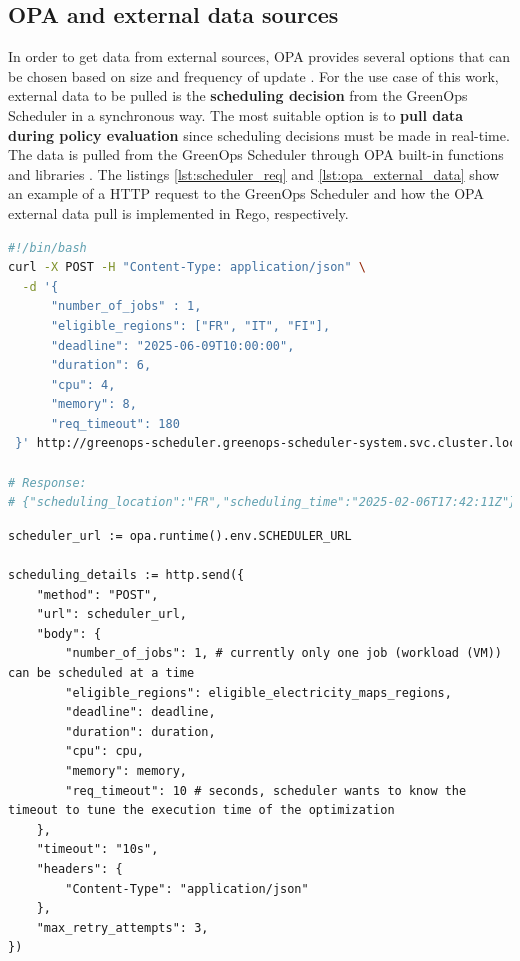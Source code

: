 \subsection{OPA and external data sources}
\label{sec:opa_external_data}

In order to get data from external sources, OPA provides several options that can be chosen based on size and frequency of update \cite{opa_external_data}.
For the use case of this work, external data to be pulled is the \textbf{scheduling decision} from the GreenOps Scheduler in a synchronous way.
The most suitable option is to \textbf{pull data during policy evaluation} since scheduling decisions must be made in real-time.
The data is pulled from the GreenOps Scheduler through OPA built-in functions and libraries \cite{opa_external_data}.
The listings \ref{lst:scheduler_req} and \ref{lst:opa_external_data} show an example of a HTTP request to the GreenOps Scheduler and how the OPA external data pull is implemented in Rego, respectively.

\begin{lstlisting}[language=sh, caption={GreenOps scheduler HTTP request example}, label={lst:scheduler_req}]
#!/bin/bash
curl -X POST -H "Content-Type: application/json" \
  -d '{
      "number_of_jobs" : 1,
      "eligible_regions": ["FR", "IT", "FI"],
      "deadline": "2025-06-09T10:00:00",
      "duration": 6,
      "cpu": 4,
      "memory": 8,
      "req_timeout": 180
 }' http://greenops-scheduler.greenops-scheduler-system.svc.cluster.local/scheduling

# Response: 
# {"scheduling_location":"FR","scheduling_time":"2025-02-06T17:42:11Z"}
\end{lstlisting}

\begin{lstlisting}[language=rego, caption={OPA external data pull}, label={lst:opa_external_data}]
scheduler_url := opa.runtime().env.SCHEDULER_URL

scheduling_details := http.send({
	"method": "POST",
	"url": scheduler_url,
	"body": {
		"number_of_jobs": 1, # currently only one job (workload (VM)) can be scheduled at a time
		"eligible_regions": eligible_electricity_maps_regions,
		"deadline": deadline,
		"duration": duration, 
		"cpu": cpu,
		"memory": memory,
		"req_timeout": 10 # seconds, scheduler wants to know the timeout to tune the execution time of the optimization
	},
	"timeout": "10s",
	"headers": {
		"Content-Type": "application/json"
	},
	"max_retry_attempts": 3,
})
\end{lstlisting}

